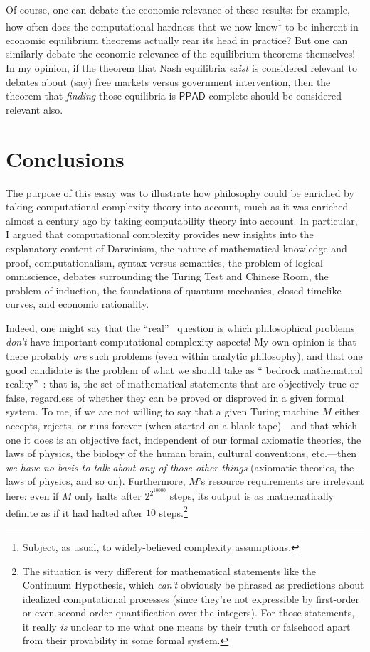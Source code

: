 \documentclass[12pt,onecolumn]{article}%
\begin{document}
Of course, one can debate the economic relevance of these results: for
example, how often does the computational hardness that we now
know\footnote{Subject, as usual, to widely-believed complexity assumptions.}
to be inherent in economic equilibrium theorems actually rear its head in
practice? But one can similarly debate the economic relevance of the
equilibrium theorems themselves! In my opinion, if the theorem that Nash
equilibria \textit{exist} is considered relevant to debates about (say) free
markets versus government intervention, then the theorem that \textit{finding}
those equilibria is $\mathsf{PPAD}$-complete should be considered relevant also.

\section{Conclusions\label{CONC}}

The purpose of this essay was to illustrate how philosophy could be enriched
by taking computational complexity theory into account, much as it was
enriched almost a century ago by taking computability theory into account.
 In particular, I argued that computational complexity provides new insights
into the explanatory content of Darwinism, the nature of mathematical
knowledge and proof, computationalism, syntax versus semantics, the problem of
logical omniscience, debates surrounding the Turing Test and Chinese Room, the
problem of induction, the foundations of quantum mechanics, closed timelike
curves, and economic rationality.

Indeed, one might say that the \textquotedblleft real\textquotedblright\ %
 question is which philosophical problems \textit{don't} have important
computational complexity aspects! My own opinion is that there probably
\textit{are} such problems (even within analytic philosophy), and that one
good candidate is the problem of what we should take as \textquotedblleft
bedrock mathematical reality\textquotedblright\ : that is, the set of
mathematical statements that are objectively true or false, regardless of
whether they can be proved or disproved in a given formal system. To me, if
we are not willing to say that a given Turing machine $M$ either accepts,
rejects, or runs forever (when started on a blank tape)---and that which one
it does is an objective fact, independent of our formal axiomatic theories,
the laws of physics, the biology of the human brain, cultural conventions,
etc.---then \textit{we have no basis to talk about any of those other things}
(axiomatic theories, the laws of physics, and so on). Furthermore, $M$'s
resource requirements are irrelevant here: even if $M$ only halts after
$2^{2^{10000}}$ steps, its output is as mathematically definite as if it had
halted after $10$ steps.\footnote{The situation is very different for
mathematical statements like the Continuum Hypothesis, which \textit{can't}
obviously be phrased as predictions about idealized computational processes
(since they're not expressible by first-order or even second-order
quantification over the integers). For those statements, it really
\textit{is} unclear to me what one means by their truth or falsehood apart
from their provability in some formal system.}
\end{document}

